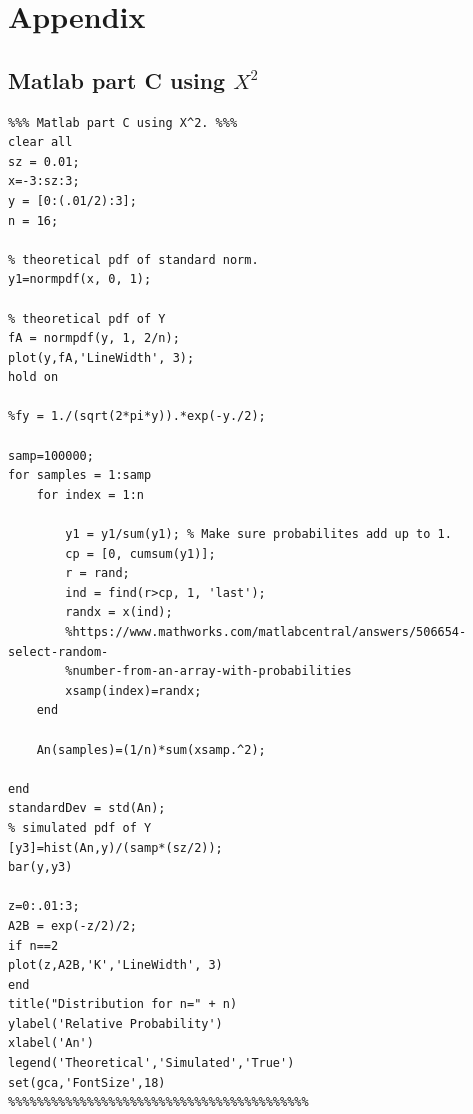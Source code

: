 \documentclass{article}
\begin{document}
\newpage
\vspace*{1cm}
\center\section*{Appendix}
\vspace*{1cm}
\raggedright\subsection*{Matlab part C using $X^2$}
\begin{lstlisting}
%%% Matlab part C using X^2. %%%
clear all
sz = 0.01;
x=-3:sz:3;
y = [0:(.01/2):3];
n = 16;

% theoretical pdf of standard norm.
y1=normpdf(x, 0, 1);

% theoretical pdf of Y
fA = normpdf(y, 1, 2/n);
plot(y,fA,'LineWidth', 3);
hold on

%fy = 1./(sqrt(2*pi*y)).*exp(-y./2);

samp=100000;
for samples = 1:samp
    for index = 1:n
        
        y1 = y1/sum(y1); % Make sure probabilites add up to 1.
        cp = [0, cumsum(y1)];
        r = rand;
        ind = find(r>cp, 1, 'last');
        randx = x(ind);                   
        %https://www.mathworks.com/matlabcentral/answers/506654-select-random-
        %number-from-an-array-with-probabilities
        xsamp(index)=randx;
    end
    
    An(samples)=(1/n)*sum(xsamp.^2);
    
end
standardDev = std(An);
% simulated pdf of Y
[y3]=hist(An,y)/(samp*(sz/2));
bar(y,y3)

z=0:.01:3;
A2B = exp(-z/2)/2;
if n==2
plot(z,A2B,'K','LineWidth', 3)
end
title("Distribution for n=" + n)
ylabel('Relative Probability')
xlabel('An')
legend('Theoretical','Simulated','True')
set(gca,'FontSize',18)
%%%%%%%%%%%%%%%%%%%%%%%%%%%%%%%%%%%%%%%%%%
\end{lstlisting}
\end{document}
